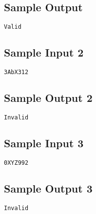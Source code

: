 \subsection*{Sample Output}
\begin{verbatim}
Valid
\end{verbatim}

\subsection*{Sample Input 2}
\begin{verbatim}
3AbX312
\end{verbatim}

\subsection*{Sample Output 2}
\begin{verbatim}
Invalid
\end{verbatim}

\subsection*{Sample Input 3}
\begin{verbatim}
0XYZ992
\end{verbatim}

\subsection*{Sample Output 3}
\begin{verbatim}
Invalid
\end{verbatim}

\newpage




